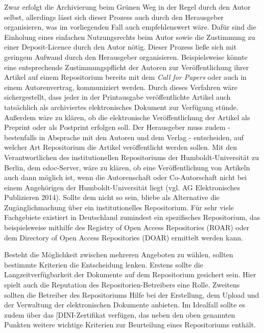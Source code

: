 \documentclass[a4paper,
fontsize=11pt,
oneside,
numbers=noperiodatend,
parskip=half-,
bibliography=totoc,
final
]{scrartcl}
\begin{document}
Zwar erfolgt die Archivierung beim Grünen Weg in der Regel durch den
Autor selbst, allerdings lässt sich dieser Prozess auch durch den
Herausgeber organisieren, was im vorliegenden Fall auch empfehlenswert
wäre. Dafür sind die Einholung eines einfachen Nutzungsrechts beim Autor
sowie die Zustimmung zu einer Deposit-Licence durch den Autor nötig.
Dieser Prozess ließe sich mit geringem Aufwand durch den Herausgeber
organisieren. Beispielsweise könnte eine entsprechende
Zustimmungspflicht der Autoren zur Veröffentlichung ihrer Artikel auf
einem Repositorium bereits mit dem \emph{Call for Papers} oder auch in
einem Autorenvertrag, kommuniziert werden. Durch dieses Verfahren wäre
sichergestellt, dass jeder in der Printausgabe veröffentlichte Artikel
auch tatsächlich als archiviertes elektronisches Dokument zur Verfügung
stünde. Außerdem wäre zu klären, ob die elektronische Veröffentlichung
der Artikel als Preprint oder als Postprint erfolgen soll. Der
Herausgeber muss zudem - bestenfalls in Absprache mit den Autoren und
dem Verlag - entscheiden, auf welcher Art Repositorium die Artikel
veröffentlicht werden sollen. Mit den Verantwortlichen des
institutionellen Repositoriums der Humboldt-Universität zu Berlin, dem
edoc-Server, wäre zu klären, ob eine Veröffentlichung von Artikeln auch
dann möglich ist, wenn die Autorenschaft oder Co-Autorschaft nicht bei
einem Angehörigen der Humboldt-Universität liegt (vgl. AG Elektronisches
Publizieren 2014). Sollte dem nicht so sein, bliebe als Alternative die
Zugänglichmachung über ein institutionelles Repositorium. Für sehr viele
Fachgebiete existiert in Deutschland zumindest ein spezifisches
Repositorium, das beispielsweise mithilfe des Registry of Open Access
Repositories (ROAR) oder dem Directory of Open Access Repositories
(DOAR) ermittelt werden kann.

Besteht die Möglichkeit zwischen mehreren Angeboten zu wählen, sollten
bestimmte Kriterien die Entscheidung lenken. Erstens sollte die
Langzeitverfügbarkeit der Dokumente auf dem Repositorium gesichert sein.
Hier spielt auch die Reputation des Repositorien-Betreibers eine Rolle.
Zweitens sollten die Betreiber des Repositoriums Hilfe bei der
Erstellung, dem Upload und der Verwaltung der elektronischen Dokumente
anbieten. Im Idealfall sollte es zudem über das {[}DINI-Zertifikat
verfügen, das neben den oben genannten Punkten weitere wichtige
Kriterien zur Beurteilung eines Repositoriums enthält.
\end{document}
